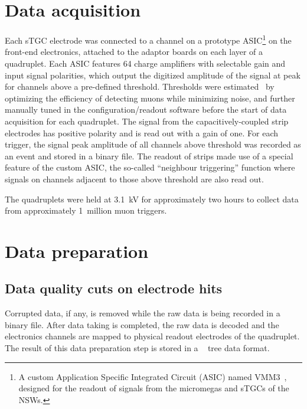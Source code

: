 \section{Data acquisition}
Each sTGC electrode was connected to a channel on a prototype ASIC\footnote{A custom Application Specific Integrated Circuit (ASIC) named VMM3~\cite{iakovidis_vmm3_2017}, designed for the readout of signals from the micromegas and sTGCs of the NSWs.} on the front-end electronics, attached to the adaptor boards on each layer of a quadruplet. Each ASIC features 64 charge amplifiers with selectable gain and input signal polarities, which output the digitized amplitude of the signal at peak for channels above a pre-defined threshold. Thresholds were estimated~\cite{chen_calibration_2019} by optimizing the efficiency of detecting muons while minimizing noise, and further manually tuned in the configuration/readout software before the start of data acquisition for each quadruplet. The signal from the capacitively-coupled strip electrodes has positive polarity and is read out with a gain of one. For each trigger, the signal peak amplitude of all channels above threshold was recorded  as an event and stored in a binary file. The readout of strips made use of a special feature of the custom ASIC, the so-called ``neighbour triggering'' function where signals on channels adjacent to those above threshold are also read out.

The quadruplets were held at \SI{3.1}{kV} for approximately two hours to collect data from approximately 1~million muon triggers.

\section{Data preparation}
\subsection{Data quality cuts on electrode hits}
\label{subsec:hit_cuts}
Corrupted data, if any, is removed while the raw data is being recorded in a binary file. After data taking is completed, the raw data is decoded and the electronics channels are mapped to physical readout electrodes of the quadruplet. The result of this data preparation step is stored in a ~\cite{ROOT_paper} tree data format. 


